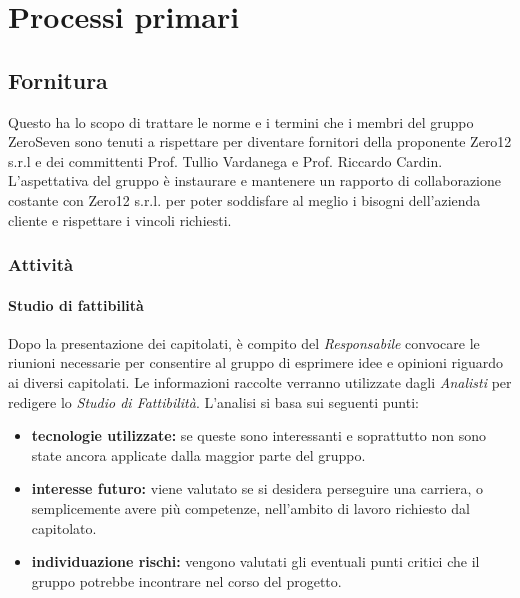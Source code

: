 \section{Processi primari}
\subsection{Fornitura}			
Questo  ha lo scopo di trattare le norme e i termini che i membri del gruppo ZeroSeven sono tenuti a rispettare per diventare fornitori della proponente Zero12 s.r.l e dei committenti Prof. Tullio Vardanega e Prof. Riccardo Cardin. \\
L'aspettativa del gruppo è instaurare e mantenere un rapporto di collaborazione costante con Zero12 s.r.l. per poter soddisfare al meglio i bisogni dell'azienda cliente e rispettare i vincoli richiesti.

\subsubsection{Attività}
\paragraph{Studio di fattibilità} 
Dopo la presentazione dei capitolati, è compito del \textit{Responsabile} convocare le riunioni necessarie per consentire al gruppo di esprimere idee e opinioni riguardo ai diversi capitolati. Le informazioni raccolte verranno utilizzate dagli \textit{Analisti} per redigere lo \textit{Studio di Fattibilità}. L'analisi si basa sui seguenti punti:
\begin{itemize}
	\item \textbf{tecnologie utilizzate:} se queste sono interessanti e soprattutto non sono state ancora applicate dalla maggior parte del gruppo.
	\item \textbf{interesse futuro:} viene valutato se si desidera perseguire una carriera, o semplicemente avere più competenze, nell'ambito di lavoro richiesto dal capitolato.
	\item \textbf{individuazione rischi:} vengono valutati gli eventuali punti critici che il gruppo potrebbe incontrare nel corso del progetto.
\end{itemize}

